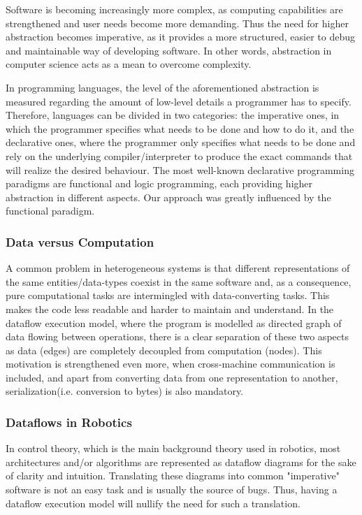 \documentclass[sigplan,review,anonymous]{acmart}\settopmatter{printfolios=true,printacmref=false}
\begin{document}
Software is becoming increasingly more complex, as computing capabilities are strengthened and user needs become more demanding. Thus the need for higher abstraction becomes imperative, as it provides a more structured, easier to debug and maintainable way of developing software. In other words, abstraction in computer science acts as a mean to overcome complexity.

In programming languages, the level of the aforementioned abstraction is measured regarding the amount of low-level details a programmer has to specify. Therefore, languages can be divided in two categories: the imperative ones, in which the programmer specifies what needs to be done and how to do it, and the declarative ones, where the programmer only specifies what needs to be done and rely on the underlying compiler/interpreter to produce the exact commands that will realize the desired behaviour. The most well-known declarative programming paradigms are functional and logic programming, each providing higher abstraction in different aspects. Our approach was greatly influenced by the functional paradigm.

\subsubsection{Data versus Computation}

A common problem in heterogeneous systems is that different representations of the same entities/data-types coexist in the same software and, as a consequence, pure computational tasks are intermingled with data-converting tasks. This makes the code less readable and harder to maintain and understand. In the dataflow execution model, where the program is modelled as directed graph of data flowing between operations, there is a clear separation of these two aspects as data (edges) are completely decoupled from computation (nodes). This motivation is strengthened even more, when cross-machine communication is included, and apart from converting data from one representation to another, serialization(i.e. conversion to bytes) is also mandatory.

\subsubsection{Dataflows in Robotics}

In control theory, which is the main background theory used in robotics, most architectures and/or algorithms are represented as dataflow diagrams for the sake of clarity and intuition. Translating these diagrams into common "imperative" software is not an easy task and is usually the source of bugs. Thus, having a dataflow execution model will nullify the need for such a translation.
\end{document}

